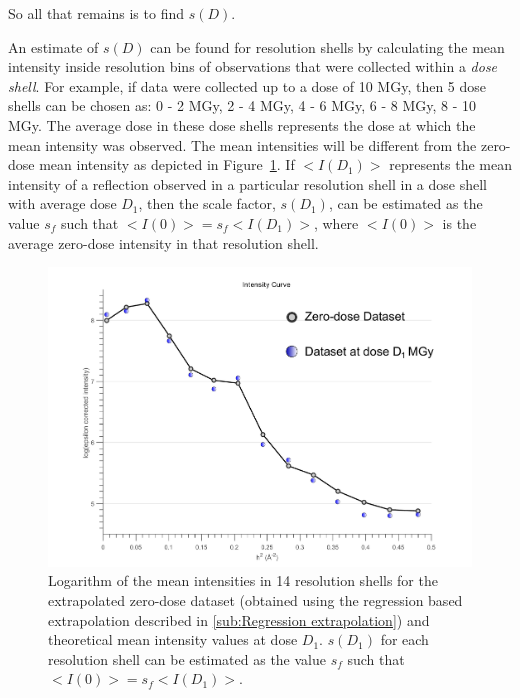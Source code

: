 So all that remains is to find $s(D)$.

An estimate of $s(D)$ can be found for resolution shells by calculating the mean intensity inside resolution bins of observations that were collected within a \textit{dose shell}.
For example, if data were collected up to a dose of 10 MGy, then 5 dose shells can be chosen as: 0 - 2 MGy, 2 - 4 MGy, 4 - 6 MGy, 6 - 8 MGy, 8 - 10 MGy.
The average dose in these dose shells represents the dose at which the mean intensity was observed.
The mean intensities will be different from the zero-dose mean intensity as depicted in Figure~\ref{fig:mean intensity in resolution shells, various doses - Extrapolation method}.
If $<I(D_1)>$ represents the mean intensity of a reflection observed in a particular resolution shell in a dose shell with average dose $D_1$, then the scale factor, $s(D_1)$, can be estimated as the value $s_f$ such that $<I(0)> = s_f <I(D_1)>$, where $<I(0)>$ is the average zero-dose intensity in that resolution shell.
\begin{figure}
  \centering
    \includegraphics[width=1\textwidth]{figures/zde/extrapolationscaling_scale_points.pdf}
    \caption[Logarithm of the zero-dose mean intensities in 14 resolution shells with theoretical means for a later dataset.]{Logarithm of the mean intensities in 14 resolution shells for the extrapolated zero-dose dataset (obtained using the regression based extrapolation described in \ref{sub:Regression extrapolation}) and theoretical mean intensity values at dose $D_1$.
    $s(D_1)$ for each resolution shell can be estimated as the value $s_f$ such that $<I(0)> = s_f <I(D_1)>$.}
    \label{fig:mean intensity in resolution shells, various doses - Extrapolation method}
\end{figure}

